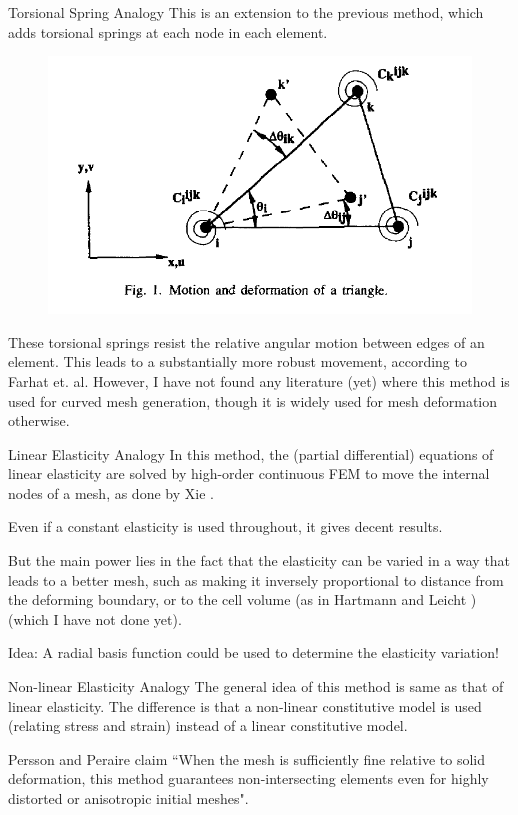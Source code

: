 \documentclass[mathserif]{beamer}
\begin{document}
\begin{frame}{Torsional Spring Analogy}
This is an extension to the previous method, which adds torsional springs at each node in each element. 

\begin{figure}
\includegraphics[scale=0.25]{torsionspring}
\end{figure}

These torsional springs resist the relative angular motion between edges of an element. This leads to a substantially more robust movement, according to Farhat et. al. \cite{farhat} However, I have not found any literature (yet) where this method is used for curved mesh generation, though it is widely used for mesh deformation otherwise.
\end{frame}

\begin{frame}{Linear Elasticity Analogy}
In this method, the (partial differential) equations of linear elasticity are solved by high-order continuous FEM to move the internal nodes of a mesh, as done by Xie \cite{xie}.

Even if a constant elasticity is used throughout, it gives decent results. 

But the main power lies in the fact that the elasticity can be varied in a way that leads to a better mesh, such as making it inversely proportional to distance from the deforming boundary, or to the cell volume (as in Hartmann and Leicht \cite{hartmann}) (which I have not done yet).

Idea: A radial basis function could be used to determine the elasticity variation!
\end{frame}

\begin{frame}{Non-linear Elasticity Analogy}
The general idea of this method is same as that of linear elasticity. The difference is that a non-linear constitutive model is used (relating stress and strain) instead of a linear constitutive model. 

Persson and Peraire claim \cite{persson} ``When the mesh is sufficiently fine relative to solid deformation, this method guarantees non-intersecting elements even for highly distorted or anisotropic initial meshes".
\end{frame}
\end{document}
